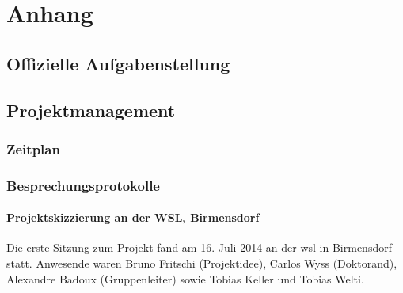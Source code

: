 %
%



\appendix
\chapter{Anhang}\label{chap.anhang}


\section{Offizielle Aufgabenstellung}\label{app.aufgabenstellung}



\section{Projektmanagement}\label{app.projektmanagement}

\subsection{Zeitplan}

\subsection{Besprechungsprotokolle}

\subsubsection{Projektskizzierung an der WSL, Birmensdorf}
Die erste Sitzung zum Projekt fand am 16. Juli 2014 an der \gls{wsl} in Birmensdorf statt. Anwesende waren Bruno Fritschi (Projektidee), Carlos Wyss (Doktorand), Alexandre Badoux (Gruppenleiter) sowie Tobias Keller und Tobias Welti.

